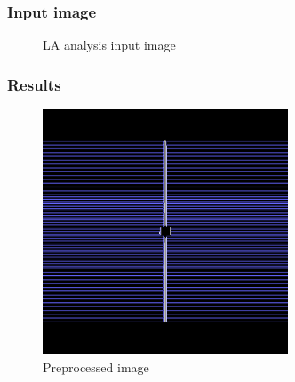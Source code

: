 \subsubsection{Input image}

\begin{figure}[H]
    \centering
    \caption{LA analysis input image}
\end{figure}

\subsubsection{Results}

\begin{figure}[H]
    \centering
    \includegraphics[width=0.65\textwidth]{Content/Images/analysis_la_oncology_preprocessed_image.png}
    \caption{Preprocessed image}
\end{figure}

